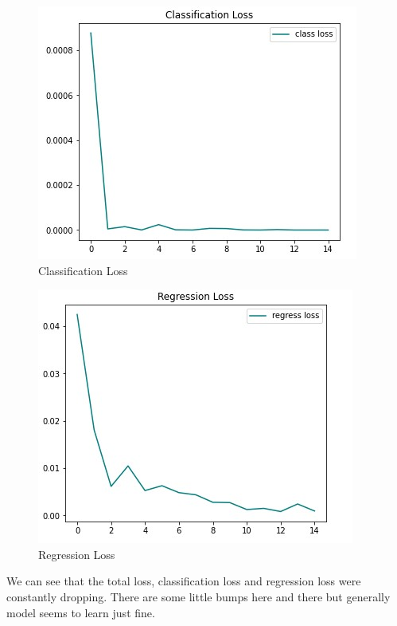 \documentclass[conference]{IEEEtran}
\begin{document}
\begin{figure}[htbp]
\centering
\includegraphics[scale=0.75]{classification_loss.jpg}
\caption{Classification Loss}
\label{fig:ClassificationLoss}
\end{figure}

\begin{figure}[htbp]
\centering
\includegraphics[scale=0.75]{regression_loss.jpg}
\caption{Regression Loss}
\label{fig:RegressionLoss}
\end{figure}

We can see that the total loss, classification loss and regression loss were constantly dropping. There are some little bumps here and there but generally model seems to learn just fine. 
\end{document}

